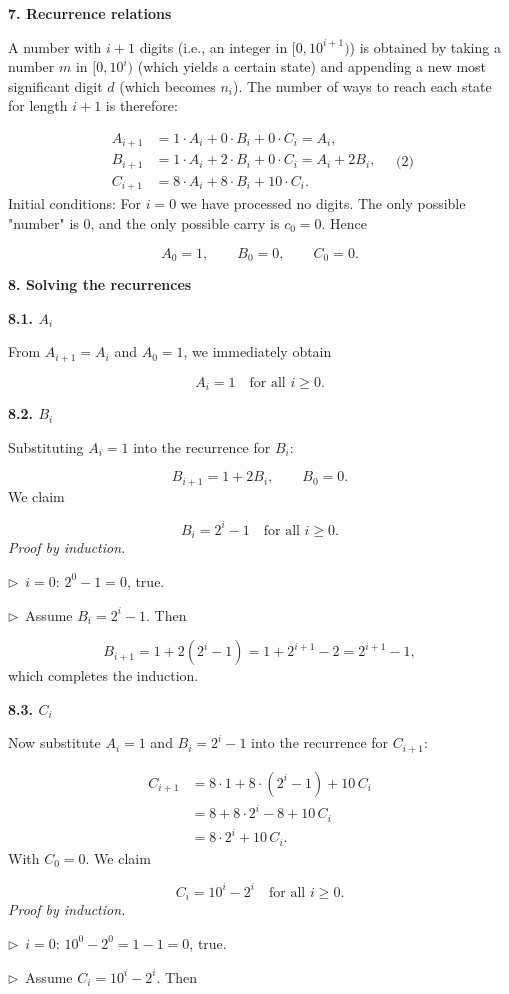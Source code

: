 \documentclass{llmxive}
\providecommand{\solutionheading}[1]{\par\smallskip\noindent\textbf{#1}\par}
\providecommand{\compactbullet}[1]{\par\noindent$\triangleright$~#1\par}
\begin{document}
\solutionheading{7. Recurrence relations}
A number with \(i+1\) digits (i.e., an integer in \([0,10^{i+1})\)) is obtained by taking a number \(m\) in \([0,10^i)\) (which yields a certain state) and appending a new most significant digit \(d\) (which becomes \(n_i\)). The number of ways to reach each state for length \(i+1\) is therefore:\par
\[
\begin{aligned}
A_{i+1} &= 1\cdot A_i + 0\cdot B_i + 0\cdot C_i = A_i, \\[4pt]
B_{i+1} &= 1\cdot A_i + 2\cdot B_i + 0\cdot C_i = A_i + 2B_i, \\[4pt]
C_{i+1} &= 8\cdot A_i + 8\cdot B_i + 10\cdot C_i.
\end{aligned}
\quad\text{(2)}
\]
Initial conditions: For \(i = 0\) we have processed no digits. The only possible "number" is \(0\), and the only possible carry is \(c_0 = 0\). Hence\par
\[
A_0 = 1,\qquad B_0 = 0,\qquad C_0 = 0.
\]
\solutionheading{8. Solving the recurrences}
\solutionheading{8.1. \(A_i\)}
From \(A_{i+1} = A_i\) and \(A_0 = 1\), we immediately obtain\par
\[
\boxed{A_i = 1 \quad\text{for all } i\ge 0}.
\]
\solutionheading{8.2. \(B_i\)}
Substituting \(A_i = 1\) into the recurrence for \(B_i\):\par
\[
B_{i+1} = 1 + 2B_i,\qquad B_0 = 0.
\]
We claim\par
\[
\boxed{B_i = 2^i - 1 \quad\text{for all } i\ge 0}.
\]
\emph{Proof by induction.}\par
\compactbullet{\(i = 0\): \(2^0 - 1 = 0\), true.}
\compactbullet{Assume \(B_i = 2^i - 1\). Then}
\[
B_{i+1} = 1 + 2(2^i - 1) = 1 + 2^{i+1} - 2 = 2^{i+1} - 1,
\]
which completes the induction.\par
\solutionheading{8.3. \(C_i\)}
Now substitute \(A_i = 1\) and \(B_i = 2^i - 1\) into the recurrence for \(C_{i+1}\):\par
\[
\begin{aligned}
C_{i+1} &= 8\cdot 1 + 8\cdot (2^i - 1) + 10\,C_i \\
&= 8 + 8\cdot 2^i - 8 + 10\,C_i \\
&= 8\cdot 2^i + 10\,C_i.
\end{aligned}
\]
With \(C_0 = 0\). We claim\par
\[
\boxed{C_i = 10^i - 2^i \quad\text{for all } i\ge 0}.
\]
\emph{Proof by induction.}\par
\compactbullet{\(i = 0\): \(10^0 - 2^0 = 1 - 1 = 0\), true.}
\compactbullet{Assume \(C_i = 10^i - 2^i\). Then}
\end{document}
